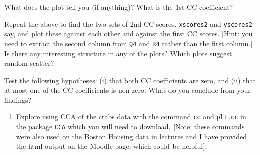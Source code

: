 \documentclass[]{book}
\newenvironment{Shaded}{\begin{snugshade}}{\end{snugshade}}
\newcommand{\CommentTok}[1]{\textcolor[rgb]{0.56,0.35,0.01}{\textit{#1}}}
\newcommand{\DecValTok}[1]{\textcolor[rgb]{0.00,0.00,0.81}{#1}}
\newcommand{\KeywordTok}[1]{\textcolor[rgb]{0.13,0.29,0.53}{\textbf{#1}}}
\newcommand{\NormalTok}[1]{#1}
\newcommand{\OperatorTok}[1]{\textcolor[rgb]{0.81,0.36,0.00}{\textbf{#1}}}
\providecommand{\tightlist}{%
  \setlength{\itemsep}{0pt}\setlength{\parskip}{0pt}}
\theoremstyle{definition}
\theoremstyle{definition}
\theoremstyle{definition}
\theoremstyle{remark}
\begin{document}
\begin{Shaded}
\end{Shaded}

What does the plot tell you (if anything)? What is the 1st CC coefficient?

Repeat the above to find the two sets of 2nd CC scores, \texttt{xscores2} and \texttt{yscores2} say, and plot these against each other and against the first CC scores. {[}Hint: you need to extract the second column from \texttt{Q4} and \texttt{R4} rather than the first column.{]} Is there any interesting structure in any of the plots? Which plots suggest random scatter?

Test the following hypotheses: (i) that both CC coefficients are zero, and (ii) that at most one of the CC coefficients is non-zero. What do you conclude from your findings?

\begin{enumerate}
\def\labelenumi{\arabic{enumi}.}
\setcounter{enumi}{1}
\tightlist
\item
  Explore using CCA of the crabs data with the command \texttt{cc} and \texttt{plt.cc} in the package \texttt{CCA} which you will need to download. {[}Note: these commands were also used on the Boston Housing data in lectures and I have provided the html output on the Moodle page, which could be helpful{]}.
\end{enumerate}
\end{document}
